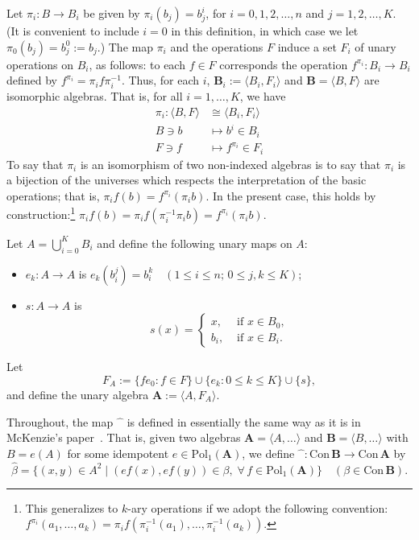 \documentclass[cm,dissertation]{uhthesis}
\theoremstyle{plain}
\theoremstyle{definition}
\theoremstyle{remark}
\numberwithin{theorem}{section}
\numberwithin{claim}{chapter}
\numberwithin{equation}{section}
\numberwithin{conjecture}{chapter}
\newcommand{\<}{\ensuremath{\langle}}
\renewcommand{\>}{\ensuremath{\rangle}}
\renewcommand{\leq}{\ensuremath{\leqslant}}
\newcommand{\Con}{\ensuremath{\mathrm{Con\,}}}
\newcommand{\Pol}{\ensuremath{\mathrm{Pol}}}
\newcommand{\supi}{\ensuremath{^{i}}}
\newcommand{\0}{\ensuremath{\mathbf{0}}}
\newcommand{\1}{\ensuremath{\mathbf{1}}}
\newcommand{\2}{\ensuremath{\mathbf{2}}}
\newcommand{\3}{\ensuremath{\mathbf{3}}}
\newcommand{\4}{\ensuremath{\mathbf{4}}}
\newcommand{\5}{\ensuremath{\mathbf{5}}}
\newcommand{\bA}{\ensuremath{\mathbf{A}}}
\newcommand{\bB}{\ensuremath{\mathbf{B}}}
\newcommand{\hatmap}{\ensuremath{\widehat{\phantom{x}}}}
\begin{document}
Let $\pi_i: B\rightarrow B_{i}$ be given by $\pi_i(b_j) = b_j^{i}$, for
$i=0, 1, 2, \dots, n$ and $j=1, 2, \dots, K$.  (It is
convenient to include $i=0$ in this definition, in which case we let 
$\pi_0(b_j) = b_j^{0} := b_j$.) 
The map $\pi_i$ and the operations $F$ induce a set $F_{i}$ of
unary operations on $B_i$, as follows:
to each $f\in F$ corresponds the operation $f^{\pi_i} : B_i \rightarrow B_i$
defined by $f^{\pi_i} = \pi_i f \pi_i^{-1}$.
Thus, for each $i$, $\bB_i := \<B_i, F_i\>$ 
and $\bB = \<B, F\>$ are isomorphic  algebras.
That is, for all $i=1,\dots, K$, we have 
\begin{align*}
  \pi_i :   \<B, F\> &\cong \< B_i, F_i\>\\
  B\ni b & \mapsto  b\supi \in B_i\\
  F\ni f &\mapsto f^{\pi_i} \in F_i
\end{align*}
To say that $\pi_i$ is an isomorphism of two non-indexed algebras
is to say that $\pi_i$ is a bijection of the universes which respects the
interpretation of the basic operations; that is, 
$\pi_if(b)= f^{\pi_i}(\pi_i b)$.  In the present case, this holds by
construction:\footnote{
  This generalizes to $k$-ary operations if we 
  adopt the following convention: $f^{\pi_i}(a_1,\dots, a_k) =
  \pi_if(\pi_i^{-1}(a_1), \dots, \pi_i^{-1}(a_k))$.}
$\pi_if(b) = \pi_i f(\pi_i^{-1}\pi_i b) = f^{\pi_i}(\pi_i b)$.

Let $A = \bigcup_{i=0}^K B_i$ and define the following unary maps on $A$:
\begin{itemize}
\item  $e_k: A\rightarrow A$ is $e_k(b_i^j)
  = b_i^k \quad (1 \leq i \leq n;\, 0\leq j, k \leq K)$;
\item $s:A\rightarrow A$ is 
  \[
  s(x) = 
  \begin{cases}
    x, & \text{ if $x\in B_0$,}\\
    b_i, & \text{ if $x\in B_i$.}
  \end{cases}
  \]
\end{itemize}
Let 
\[
F_A := \{f e_0 : f\in F\} \cup \{e_k : 0\leq k \leq K\} \cup \{s\},
\] 
and define the unary algebra $\bA := \< A, F_A\>$.  

Throughout, the map $\hatmap$ is defined
in essentially the same way as it is in McKenzie's paper~\cite{McKenzie:1983}.
That is, given two algebras $\bA = \< A, \dots\>$ 
and $\bB = \< B, \dots\>$ with $B = e(A)$ for some idempotent
$e \in \Pol_1(\bA)$,  we define
$\hatmap : \Con\bB \rightarrow \Con\bA$ by
\[
\widehat{\beta} = \{(x,y) \in A^2 \mid (ef(x), ef(y))\in \beta, \; \forall\,
f\in \Pol_1(\bA) \} \quad (\beta \in \Con\bB).
\]
\end{document}
